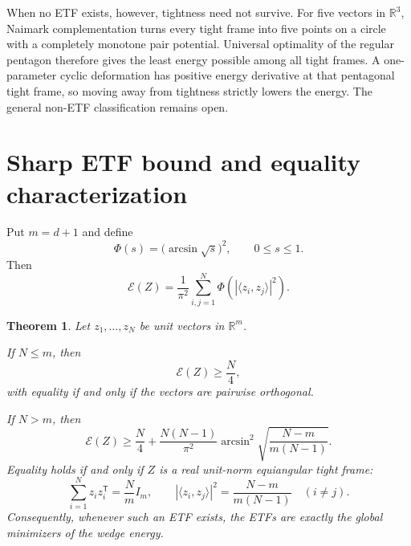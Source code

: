 \documentclass[11pt]{article}
\newtheorem{theorem}{Theorem}
\newcommand{\EE}{\mathcal E}
\begin{document}
When no ETF exists, however, tightness need not survive.  For five vectors in
$\mathbb R^3$, Naimark complementation turns every tight frame into five points
on a circle with a completely monotone pair potential.  Universal optimality
of the regular pentagon therefore gives the least energy possible among all
tight frames.  A one-parameter cyclic deformation has positive energy
derivative at that pentagonal tight frame, so moving away from tightness
strictly lowers the energy.  The general non-ETF classification remains open.

\section{Sharp ETF bound and equality characterization}

Put $m=d+1$ and define
\[
 \Phi(s)=\bigl(\arcsin\sqrt{s}\bigr)^2,\qquad 0\le s\le1.
\]
Then
\begin{equation}\label{eq:phi-energy}
 \EE(Z)=\frac1{\pi^2}\sum_{i,j=1}^N
 \Phi\!\left(|\langle z_i,z_j\rangle|^2\right).
\end{equation}

\begin{theorem}\label{thm:main}
Let $z_1,\dots,z_N$ be unit vectors in $\mathbb R^m$.

If $N\le m$, then
\[
 \EE(Z)\ge \frac N4,
\]
with equality if and only if the vectors are pairwise orthogonal.

If $N>m$, then
\begin{equation}\label{eq:bound}
 \EE(Z)\ge \frac N4+
 \frac{N(N-1)}{\pi^2}
 \arcsin^2\!\sqrt{\frac{N-m}{m(N-1)}}.
\end{equation}
Equality holds if and only if $Z$ is a real unit-norm equiangular tight frame:
\begin{equation}\label{eq:etf}
 \sum_{i=1}^N z_i z_i^{\mathsf T}=\frac Nm I_m,
 \qquad
 |\langle z_i,z_j\rangle|^2=
 \frac{N-m}{m(N-1)}\quad(i\ne j).
\end{equation}
Consequently, whenever such an ETF exists, the ETFs are exactly the global
minimizers of the wedge energy.
\end{theorem}
\end{document}
